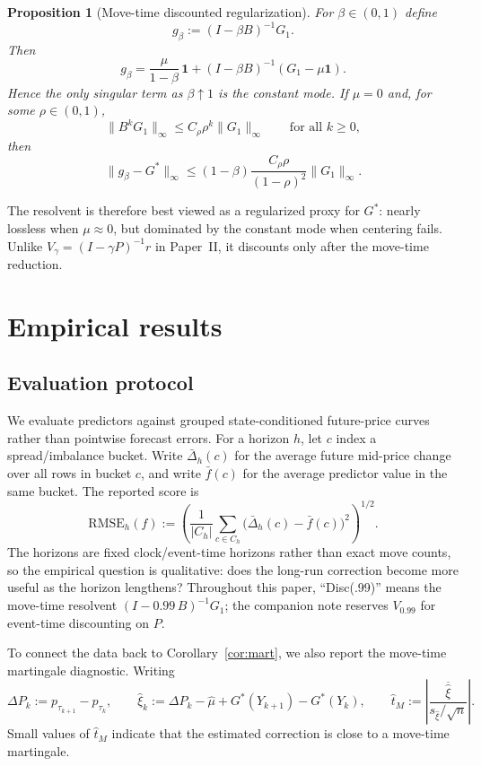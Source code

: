 \documentclass[11pt]{article}
\theoremstyle{plain}
\newtheorem{proposition}{Proposition}[section]
\newcommand{\1}{\mathbf{1}}
\newcommand{\norm}[1]{\lVert #1 \rVert}
\begin{document}
\begin{proposition}[Move-time discounted regularization]\label{prop:disc}
For $\beta\in(0,1)$ define
\[
g_\beta:=(I-\beta B)^{-1}G_1.
\]
Then
\[
g_\beta=\frac{\mu}{1-\beta}\,\1+(I-\beta B)^{-1}(G_1-\mu\1).
\]
Hence the only singular term as $\beta\uparrow 1$ is the constant mode. If $\mu=0$ and, for some $\rho\in(0,1)$,
\[
\norm{B^kG_1}_\infty\le C_\rho\rho^k\norm{G_1}_\infty
\qquad
\text{for all }k\ge 0,
\]
then
\[
\norm{g_\beta-G^*}_\infty
\le
(1-\beta)\frac{C_\rho\rho}{(1-\rho)^2}\norm{G_1}_\infty.
\]
\end{proposition}

The resolvent is therefore best viewed as a regularized proxy for $G^*$: nearly lossless when $\mu\approx 0$, but dominated by the constant mode when centering fails. Unlike $V_\gamma=(I-\gamma P)^{-1}r$ in Paper~II, it discounts only after the move-time reduction.

\section{Empirical results}

\subsection{Evaluation protocol}

We evaluate predictors against grouped state-conditioned future-price curves rather than pointwise forecast errors. For a horizon $h$, let $c$ index a spread/imbalance bucket. Write $\bar \Delta_h(c)$ for the average future mid-price change over all rows in bucket $c$, and write $\bar f(c)$ for the average predictor value in the same bucket. The reported score is
\[
\mathrm{RMSE}_h(f):=
\left(
\frac{1}{|C_h|}
\sum_{c\in C_h}\bigl(\bar \Delta_h(c)-\bar f(c)\bigr)^2
\right)^{1/2}.
\]
The horizons are fixed clock/event-time horizons rather than exact move counts, so the empirical question is qualitative: does the long-run correction become more useful as the horizon lengthens? Throughout this paper, ``Disc(.99)'' means the move-time resolvent $(I-0.99\,B)^{-1}G_1$; the companion note reserves $V_{0.99}$ for event-time discounting on $P$.

To connect the data back to Corollary~\ref{cor:mart}, we also report the move-time martingale diagnostic. Writing
\[
\Delta P_k:=p_{\tau_{k+1}}-p_{\tau_k},
\qquad
\widehat \xi_k:=\Delta P_k-\widehat\mu+G^*(Y_{k+1})-G^*(Y_k),
\qquad
\widehat t_M:=\left|\frac{\overline{\widehat \xi}}{s_{\widehat \xi}/\sqrt{n}}\right|.
\]
Small values of $\widehat t_M$ indicate that the estimated correction is close to a move-time martingale.
\end{document}

